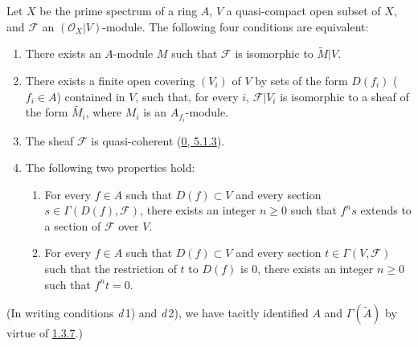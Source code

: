 \begin{theorem}[1.4.1]
\label{I.1.4.1}
Let $X$ be the prime spectrum of a ring $A$, $V$ a quasi-compact open subset
of $X$, and $\mathscr{F}$ an $(\mathscr{O}_X|V)$-module. The following
four conditions are equivalent:
\begin{enumerate}
  \item[\textit{a})] There exists an $A$-module $M$ such that $\mathscr{F}$
  is isomorphic to $\widetilde{M}|V$.
  \item[\textit{b})] There exists a finite open covering $(V_i)$ of $V$ by
  sets of the form $D(f_i)$ ($f_i\in A$) contained in $V$, such that,
  for every $i$, $\mathscr{F}|V_i$ is isomorphic to a sheaf of the form
  $\widetilde{M_i}$, where $M_i$ is an $A_{f_i}$-module.
  \item[\textit{c})] The sheaf $\mathscr{F}$ is quasi-coherent
  (\hyperref[0.5.1.3]{0, 5.1.3}).
  \item[\textit{d})] The following two properties hold:
  \begin{enumerate}
    \item[\textit{d}\,1)] For every $f\in A$ such that $D(f)\subset V$ and
    every section $s\in\Gamma(D(f),\mathscr{F})$, there exists an integer
    $n\geq0$ such that $f^n s$ extends to a section of $\mathscr{F}$ over $V$.
    \item[\textit{d}\,2)] For every $f\in A$ such that $D(f)\subset V$ and
    every section $t\in\Gamma(V,\mathscr{F})$ such that the restriction of
    $t$ to $D(f)$ is $0$, there exists an integer $n\geq0$ such that
    $f^n t=0$.
  \end{enumerate}
\end{enumerate}
\end{theorem}

(In writing conditions \textit{d}\,1) and \textit{d}\,2), we have tacitly
identified $A$ and $\Gamma(\widetilde{A})$ by virtue of
\hyperref[I.1.3.7]{1.3.7}.)

